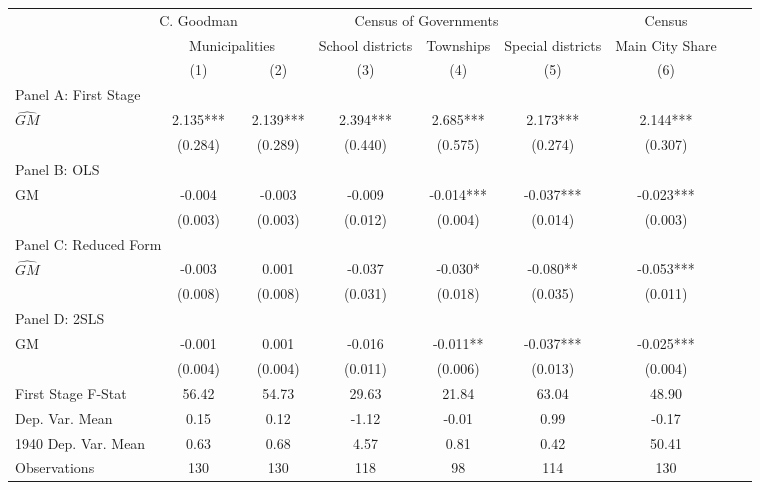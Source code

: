  \begin{tabular}{l*{8}{c}} \toprule
&\multicolumn{1}{c}{C. Goodman}&\multicolumn{4}{c}{Census of Governments}&\multicolumn{1}{c}{Census}\\\cmidrule(lr){2-2}\cmidrule(lr){3-6}\cmidrule(lr){7-7}
&\multicolumn{2}{c}{Municipalities}&\multicolumn{1}{c}{School districts}&\multicolumn{1}{c}{Townships}&\multicolumn{1}{c}{Special districts}&\multicolumn{1}{c}{Main City Share}\\\cmidrule(lr){2-3}\cmidrule(lr){4-6}\cmidrule(lr){7-7}
&\multicolumn{1}{c}{(1)}&\multicolumn{1}{c}{(2)}&\multicolumn{1}{c}{(3)}&\multicolumn{1}{c}{(4)}&\multicolumn{1}{c}{(5)}&\multicolumn{1}{c}{(6)}\\
\cmidrule(lr){1-7}
\multicolumn{6}{l}{Panel A: First Stage}\\
\cmidrule(lr){1-7}
$\widehat{GM}$  &    2.135***&    2.139***&    2.394***&    2.685***&    2.173***&    2.144***\\
                &  (0.284)   &  (0.289)   &  (0.440)   &  (0.575)   &  (0.274)   &  (0.307)   \\
\cmidrule(lr){1-7}
\multicolumn{6}{l}{Panel B: OLS}\\
\cmidrule(lr){1-7}
GM              &   -0.004   &   -0.003   &   -0.009   &   -0.014***&   -0.037***&   -0.023***\\
                &  (0.003)   &  (0.003)   &  (0.012)   &  (0.004)   &  (0.014)   &  (0.003)   \\
\cmidrule(lr){1-7}
\multicolumn{6}{l}{Panel C: Reduced Form}\\
\cmidrule(lr){1-7}
$\widehat{GM}$  &   -0.003   &    0.001   &   -0.037   &   -0.030*  &   -0.080** &   -0.053***\\
                &  (0.008)   &  (0.008)   &  (0.031)   &  (0.018)   &  (0.035)   &  (0.011)   \\
\cmidrule(lr){1-7}
\multicolumn{6}{l}{Panel D: 2SLS}\\
\cmidrule(lr){1-7}
GM              &   -0.001   &    0.001   &   -0.016   &   -0.011** &   -0.037***&   -0.025***\\
                &  (0.004)   &  (0.004)   &  (0.011)   &  (0.006)   &  (0.013)   &  (0.004)   \\
\midrule
First Stage F-Stat&    56.42   &    54.73   &    29.63   &    21.84   &    63.04   &    48.90   \\
Dep. Var. Mean  &     0.15   &     0.12   &    -1.12   &    -0.01   &     0.99   &    -0.17   \\
1940 Dep. Var. Mean&     0.63   &     0.68   &     4.57   &     0.81   &     0.42   &    50.41   \\
Observations    &      130   &      130   &      118   &       98   &      114   &      130   \\
       \bottomrule \end{tabular}
